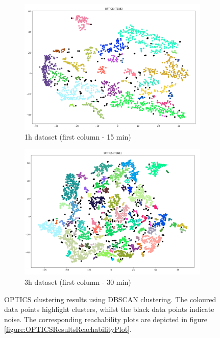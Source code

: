 \begin{figure}[H]
  \centering
  \begin{subfigure}{.5\textwidth}\captionsetup{width=.8\linewidth}
    \centering
    \includegraphics[width=1\textwidth]{./images/OPTICS/1h-1-OPTICS-DBSCAN.png}
  \caption{1h dataset (first column - 15 min)}
  \end{subfigure}%
  \hfill
  \begin{subfigure}{.5\textwidth}\captionsetup{width=.8\linewidth}
    \centering
    \includegraphics[width=1\textwidth]{./images/OPTICS/3h-1-OPTICS-DBSCAN.png}
    \caption{3h dataset (first column - 30 min)}
  \end{subfigure}
  \caption{OPTICS clustering results using DBSCAN clustering. The coloured data points highlight clusters, whilst the black data points indicate noise. The corresponding reachability plots are depicted in figure \ref{figure:OPTICSResultsReachabilityPlot}.}
  \label{figure:OPTICSResults}
  \end{figure}

